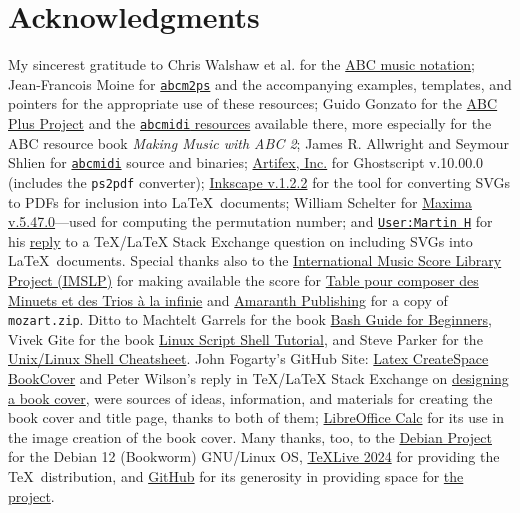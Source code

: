 \documentclass[a4paper,x11names,svgnames,10pt]{article}
\begin{document}
{\section{Acknowledgments}
My sincerest gratitude to Chris Walshaw et al. for the \href{http://www.abcnotation.com/}{ABC music notation}; Jean-Francois Moine for \href{http://moinejf.free.fr/}{\tt abcm2ps} and the accompanying examples, templates, and pointers for the appropriate use of these resources; Guido Gonzato for the \href{http://abcplus.sourceforge.net/}{ABC Plus Project} and the \href{http://abcplus.sourceforge.net/#abcMIDI}{{\tt abcmidi} resources} available there, more especially for the ABC resource book {\em Making Music with ABC 2}; James R. Allwright and Seymour Shlien for \href{http://abc.sourceforge.net/abcMIDI}{\tt abcmidi} source and binaries; \href{https://artifex.com/}{Artifex, Inc.} for Ghostscript v.10.00.0 (includes the {\tt ps2pdf} converter); \href{https://www.inkscape.org/}{Inkscape v.1.2.2} for the tool for converting SVGs to PDFs for inclusion into \LaTeX\ documents; William Schelter for \href{https://maxima.sourceforge.io}{Maxima v.5.47.0}---used for computing the permutation number; and \href{https://tex.stackexchange.com/users/632/martin-h}{\tt User:Martin H} for his \href{https://tex.stackexchange.com/questions/2099/how-to-include-svg-diagrams-in-latex}{reply} to a TeX/LaTeX Stack Exchange question on including SVGs into \LaTeX\ documents. Special thanks also to the \href{http://imslp.org/}{International Music Score Library Project (IMSLP)} for making available the score for \href{http://imslp.org/wiki/Table\_pour\_composer\_des\_Minuets\_et\_des\_Trios\_\%C3\%A0\_la\_infinie\_(Stadler,_Maximilian)}{
Table pour composer des Minuets et des Trios à la infinie} and \href{https://www.amaranthpublishing.com/MozartDiceGame.htm}{Amaranth Publishing} for a copy of {\tt mozart.zip}. Ditto to Machtelt Garrels for the book \href{http://tldp.org/LDP/Bash-Beginners-Guide/html/Bash-Beginners-Guide.html}{Bash Guide for Beginners}, Vivek Gite for the book \href{http://www.freeos.com/guides/lsst/}{Linux Script Shell Tutorial}, and Steve Parker for the \href{http://steve-parker.org/sh/cheatsheet.pdf}{Unix/Linux Shell Cheatsheet}. John Fogarty's GitHub Site: \href{https://github.com/jfogarty/latex-createspace-bookcover}{Latex CreateSpace BookCover} and Peter Wilson's reply in TeX/LaTeX Stack Exchange on \href{https://tex.stackexchange.com/questions/17579/how-can-i-design-a-book-cover}{designing a book cover}, were sources of ideas, information, and materials for creating the book cover and title page, thanks to both of them; \href{http://www.libreoffice.org/}{LibreOffice Calc} for its use in the image creation of the book cover.  Many thanks, too, to the \href{https://www.debian.org}{Debian Project} for the Debian 12 (Bookworm) GNU/Linux OS, \href{http://www.tug.org/texlive/}{TeXLive 2024} for providing the \TeX\ distribution,  and \href{https://github.com}{GitHub} for its generosity in providing space for \href{https://github.com/justineuro/mdgBookSVGKit}{the project}.  

}
\end{document}
